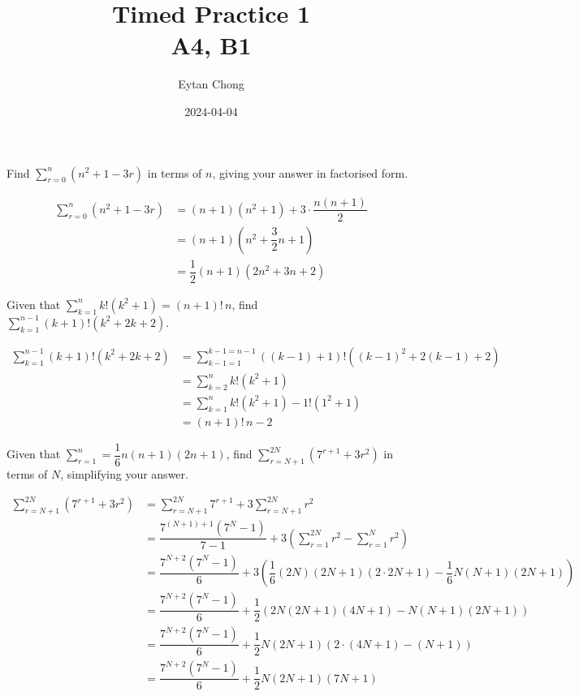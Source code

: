 \documentclass{jhwhw}
\title{Timed Practice 1\\A4, B1}
\author{Eytan Chong}
\date{2024-04-04}
\begin{document}
    \problem{}
        Find $\sum\limits_{r = 0}^n \left(n^2 + 1 - 3r\right)$ in terms of $n$, giving your answer in factorised form.

    \solution
        \begin{align*}
            \sum_{r = 0}^n \left(n^2 + 1 - 3r\right) &= (n+1)(n^2 + 1) + 3 \cdot \dfrac{n(n+1)}2\\
            &= (n+1)\left(n^2 + \dfrac32 n + 1\right)\\
            &= \dfrac12 (n+1)(2n^2 + 3n + 2)
        \end{align*}


    \problem{}
        Given that $\sum\limits_{k=1}^n k!\left(k^2 + 1\right) = (n+1)!\,n$, find $\sum\limits_{k=1}^{n-1} (k+1)!\left(k^2 + 2k + 2\right)$.

    \solution
        \begin{align*}
            \sum_{k=1}^{n-1} (k+1)!\left(k^2 + 2k + 2\right) &= \sum_{k-1=1}^{k-1=n-1} \left((k-1)+1\right)!\left((k-1)^2 + 2(k-1) + 2\right)\\
            &= \sum_{k=2}^{n} k! \left(k^2 + 1\right)\\
            &= \sum_{k=1}^{n} k! \left(k^2 + 1\right) - 1! \left(1^2 + 1\right)\\
            &= (n+1)! \, n - 2
        \end{align*}


    \problem{}
        Given that $\sum\limits_{r=1}^n = \dfrac16 n(n+1)(2n+1)$, find $\sum\limits_{r=N+1}^{2N} \left(7^{r+1} + 3r^2\right)$ in terms of $N$, simplifying your answer.

    \solution
        \begin{align*}
            \sum_{r=N+1}^{2N} \left(7^{r+1} + 3r^2\right) &= \sum_{r=N+1}^{2N} 7^{r+1} + 3\sum_{r=N+1}^{2N} r^2 \\
            &= \dfrac{7^{(N+1)+1}(7^N - 1)}{7-1} + 3\left(\sum_{r=1}^{2N} r^2 - \sum_{r=1}^{N} r^2\right)\\
            &= \dfrac{7^{N+2}(7^N - 1)}{6} + 3\left(\dfrac16 (2N)(2N+1)(2 \cdot 2N + 1) - \dfrac16 N(N+1)(2N+1)\right)\\
            &= \dfrac{7^{N+2}(7^N - 1)}{6} + \dfrac12\left(2N(2N+1)(4N + 1) - N(N+1)(2N+1)\right)\\
            &= \dfrac{7^{N+2}(7^N - 1)}{6} + \dfrac12 N(2N+1)(2 \cdot (4N + 1) - (N+1))\\
            &= \dfrac{7^{N+2}(7^N - 1)}{6} + \dfrac12 N(2N+1)(7N+1)
        \end{align*}
\end{document}
